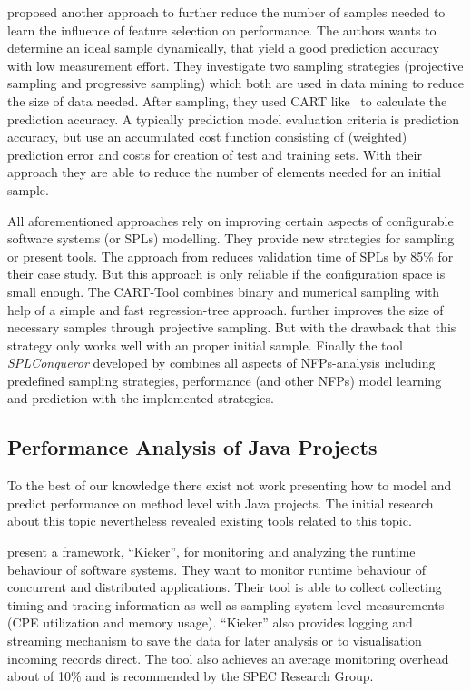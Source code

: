 \cite{sarkar2015cost} proposed another approach to further reduce the number of samples needed to learn the influence of feature selection on performance. The authors wants to determine an ideal sample dynamically, that yield a good prediction accuracy with low measurement effort. They investigate two sampling strategies (projective sampling and progressive sampling) which both are used in data mining to reduce the size of data needed. After sampling, they used \ac{CART} like~\cite{guo2013variability} to calculate the prediction accuracy. A typically prediction model evaluation criteria is prediction accuracy, but \cite{sarkar2015cost} use an accumulated cost function consisting of (weighted) prediction error and costs for creation of test and training sets. With their approach they are able to reduce the number of elements needed for an initial sample. 

All aforementioned approaches rely on improving certain aspects of configurable software systems (or \acp{SPL}) modelling. They provide new strategies for sampling or present tools. The approach from \cite{thum2012family} reduces validation time of \acp{SPL} by 85\% for their case study. But this approach is only reliable if the configuration space is small enough. The \ac{CART}-Tool combines binary and numerical sampling with help of a simple and fast regression-tree approach. \cite{sarkar2015cost} further improves the size of necessary samples through projective sampling. But with the drawback that this strategy only works well with an proper initial sample. Finally the tool \textit{SPLConqueror} developed by \cite{siegmund2012spl} combines all aspects of \acp{NFP}-analysis including predefined sampling strategies, performance (and other \acp{NFP}) model learning and prediction with the implemented strategies. 

\subsection{Performance Analysis of Java Projects}
\label{rel_perf_java}

To the best of our knowledge there exist not work presenting how to model and predict performance on method level with Java projects. The initial research about this topic nevertheless revealed existing tools related to this topic. 

\cite{vanHoorn2012kieker} present a framework, ``Kieker'', for monitoring and analyzing the runtime behaviour of software systems. They want to monitor runtime behaviour of concurrent and distributed applications. Their tool is able to collect collecting timing and tracing information as well as sampling system-level measurements (CPE utilization and memory usage). ``Kieker'' also provides logging and streaming mechanism to save the data for later analysis or to visualisation incoming records direct. The tool also achieves an average monitoring overhead about of 10\% and is recommended by the SPEC Research Group.

